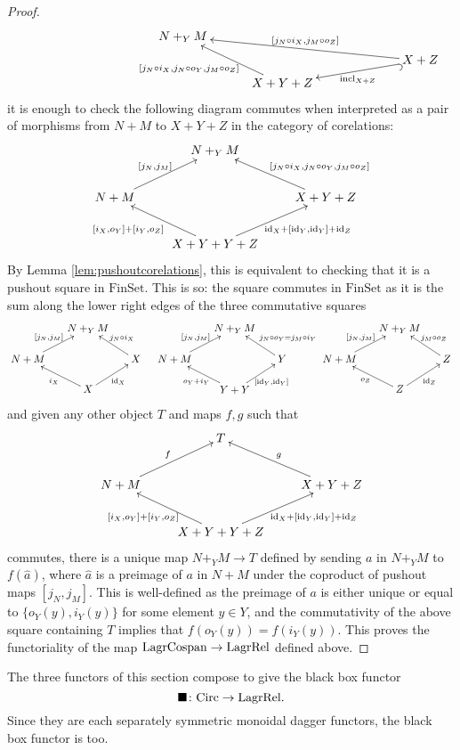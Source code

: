 \begin{proof}
\[
  \xymatrix@C=30pt@R=5pt{
    &&&N+_YM \\
    &&&& && X+Z
    \ar@{^{(}->}[dll]^(.48){\textrm{incl}_{X+Z}} 
    \ar_{[j_N\circ i_X, j_M \circ o_Z]}[ulll] \\
    &&&& X+Y+Z \ar[uul]^{[j_N\circ i_X,j_N\circ o_Y,j_M\circ o_Z]\qquad}
  }
\]
it is enough to check the following diagram commutes when interpreted as a pair
of morphisms from $N+M$ to $X+Y+Z$ in the category of corelations: 
\[
  \xymatrix{
    & N+_YM \\
    N+M \ar[ur]^{[j_N,j_M]} && X+Y+Z \ar[ul]_{\qquad\quad[j_N\circ i_X,j_N\circ o_Y,j_M\circ o_Z]} \\
    & X+Y+Y+Z \ar[ul]^{[i_X,o_Y]+[i_Y,o_Z]\qquad} \ar[ur]_{\qquad\idn_X+[\idn_Y,\idn_Y]+\idn_Z} 
  }
\]
By Lemma \ref{lem:pushoutcorelations}, this is equivalent to checking that it is
a pushout square in $\mathrm{FinSet}$.  This is so: the square commutes in
$\mathrm{FinSet}$ as it is the sum along the lower right edges of the three
commutative squares
\[
\xymatrix@=1.5em{
& N+_YM \\
N+M \ar[ur]^{[j_N,j_M]} && X \ar[ul]_{j_N\circ i_X} \\
& X \ar[ur]_{\idn_X} \ar[ul]^{i_X} 
}
\quad
\xymatrix@=1.5em{
& N+_YM \\
N+M \ar[ur]^{[j_N,j_M]} && Y \ar[ul]_{\quad j_N\circ o_Y=j_M\circ i_Y} \\
& Y+Y \ar[ul]^{o_Y+i_Y} \ar[ur]_{[\idn_Y,\idn_Y]} 
} 
\xymatrix@=1.5em{
& N+_YM \\
N+M \ar[ur]^{[j_N,j_M]} && Z \ar[ul]_{j_M\circ o_Z} \\
& Z \ar[ul]^{o_Z} \ar[ur]_{\idn_Z} 
} 
\]
and given any other object $T$ and maps $f,g$ such that
\[
  \xymatrix{
    & T \\
    N+M \ar[ur]^{f} && X+Y+Z \ar[ul]_{g} \\
    & X+Y+Y+Z \ar[ul]^{[i_X,o_Y]+[i_Y,o_Z]\quad} \ar[ur]_{\qquad \idn_X+[\idn_Y,\idn_Y]+\idn_Z} 
  }
\]
commutes, there is a unique map $N+_YM \to T$ defined by sending $a$ in $N+_YM$
to $f(\hat a)$, where $\hat a$ is a preimage of $a$ in $N+M$ under the coproduct
of pushout maps $[j_N,j_M]$. This is well-defined as the preimage of $a$ is
either unique or equal to $\{o_Y(y),i_Y(y)\}$ for some element $y \in Y$, and
the commutativity of the above square containing $T$ implies that $f(o_Y(y)) =
f(i_Y(y))$. This proves the functoriality of the map $\mathrm{LagrCospan} \to
\mathrm{LagrRel}$ defined above.
\end{proof}

The three functors of this section compose to give the black box functor
\[
\blacksquare{\colon} \mathrm{Circ} \to \mathrm{LagrRel}.
\] 
Since they are each separately symmetric monoidal dagger functors, the black box
functor is too.




